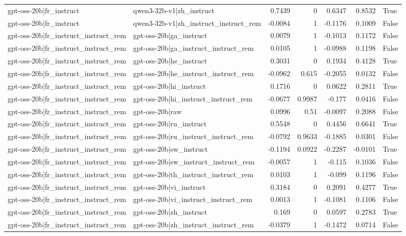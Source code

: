 \begin{table}
\begin{tabular}{l l r r r r l}
gpt-oss-20b|fr_instruct & qwen3-32b-v1|zh_instruct & 0.7439 & 0 & 0.6347 & 0.8532 & True \\
gpt-oss-20b|fr_instruct & qwen3-32b-v1|zh_instruct_instruct_rem & -0.0084 & 1 & -0.1176 & 0.1009 & False \\
gpt-oss-20b|fr_instruct_instruct_rem & gpt-oss-20b|ga_instruct & 0.0079 & 1 & -0.1013 & 0.1172 & False \\
gpt-oss-20b|fr_instruct_instruct_rem & gpt-oss-20b|ga_instruct_instruct_rem & 0.0105 & 1 & -0.0988 & 0.1198 & False \\
gpt-oss-20b|fr_instruct_instruct_rem & gpt-oss-20b|he_instruct & 0.3031 & 0 & 0.1934 & 0.4128 & True \\
gpt-oss-20b|fr_instruct_instruct_rem & gpt-oss-20b|he_instruct_instruct_rem & -0.0962 & 0.615 & -0.2055 & 0.0132 & False \\
gpt-oss-20b|fr_instruct_instruct_rem & gpt-oss-20b|hi_instruct & 0.1716 & 0 & 0.0622 & 0.2811 & True \\
gpt-oss-20b|fr_instruct_instruct_rem & gpt-oss-20b|hi_instruct_instruct_rem & -0.0677 & 0.9987 & -0.177 & 0.0416 & False \\
gpt-oss-20b|fr_instruct_instruct_rem & gpt-oss-20b|raw & 0.0996 & 0.51 & -0.0097 & 0.2088 & False \\
gpt-oss-20b|fr_instruct_instruct_rem & gpt-oss-20b|ru_instruct & 0.5548 & 0 & 0.4456 & 0.6641 & True \\
gpt-oss-20b|fr_instruct_instruct_rem & gpt-oss-20b|ru_instruct_instruct_rem & -0.0792 & 0.9633 & -0.1885 & 0.0301 & False \\
gpt-oss-20b|fr_instruct_instruct_rem & gpt-oss-20b|sw_instruct & -0.1194 & 0.0922 & -0.2287 & -0.0101 & True \\
gpt-oss-20b|fr_instruct_instruct_rem & gpt-oss-20b|sw_instruct_instruct_rem & -0.0057 & 1 & -0.115 & 0.1036 & False \\
gpt-oss-20b|fr_instruct_instruct_rem & gpt-oss-20b|th_instruct_instruct_rem & 0.0103 & 1 & -0.099 & 0.1196 & False \\
gpt-oss-20b|fr_instruct_instruct_rem & gpt-oss-20b|vi_instruct & 0.3184 & 0 & 0.2091 & 0.4277 & True \\
gpt-oss-20b|fr_instruct_instruct_rem & gpt-oss-20b|vi_instruct_instruct_rem & 0.0013 & 1 & -0.1081 & 0.1106 & False \\
gpt-oss-20b|fr_instruct_instruct_rem & gpt-oss-20b|zh_instruct & 0.169 & 0 & 0.0597 & 0.2783 & True \\
gpt-oss-20b|fr_instruct_instruct_rem & gpt-oss-20b|zh_instruct_instruct_rem & -0.0379 & 1 & -0.1472 & 0.0714 & False \\

\end{tabular}
\end{table}
